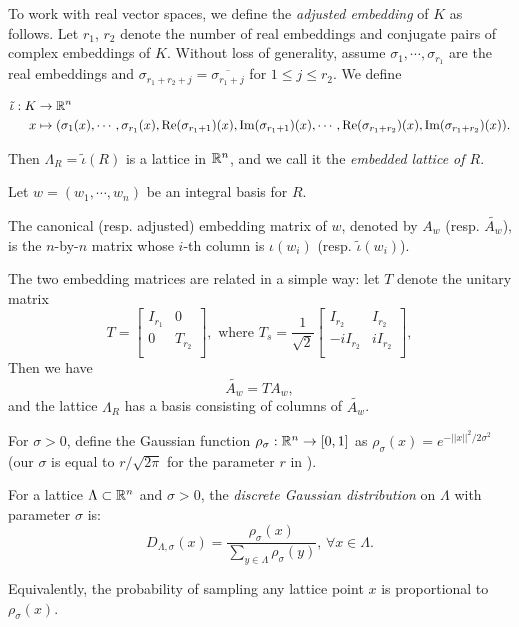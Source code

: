 \documentclass[envcountsame]{llncs}
\begin{document}
To work with real vector spaces, we define the {\it adjusted embedding} of $K$ as follows. Let $r_1$, $r_2$ denote the number of real embeddings and conjugate pairs of complex embeddings of $K$. Without loss of generality, assume $\sigma_1, \cdots, \sigma_{r_1}$ are the real embeddings and $\sigma_{r_1+r_2+j} = \overline{\sigma_{r_1 + j}}$ for $1 \leq j \leq r_2$. We define

\begin{align*}
    \tilde{\iota}: K & \to \mathbb{R}^n \\
    x & \mapsto (\sigma_1(x), \cdots, \sigma_{r_1}(x), \Re(\sigma_{r_1+1})(x), \Im(\sigma_{r_1+1})(x), \cdots,  \Re(\sigma_{r_1+r_2})(x), \Im(\sigma_{r_1+r_2})(x)).
\end{align*}

Then $\Lambda_R = \tilde{\iota}(R)$ is a lattice in $\mathbb{R}^n$, and we call it the {\it embedded lattice of $R$}.

Let $w = (w_1, \cdots , w_n)$ be an integral basis for $R$.

\begin{definition}
The canonical (resp. adjusted) embedding matrix of $w$, denoted by $A_w$ (resp. $\widetilde{A_w}$), is the $n$-by-$n$ matrix whose $i$-th column is $\iota(w_i)$ (resp. $\tilde{\iota}(w_i)$).
\end{definition}

The two embedding matrices are related in a simple way:
let $T$ denote the unitary matrix
\[
T = \begin{bmatrix}
    I_{r_1}  & 0  \\
    0     & T_{r_2} \\
\end{bmatrix},
\mbox{ where } T_s = \frac{1}{\sqrt{2}} \begin{bmatrix}
    I_{r_2}  & I_{r_2} \\
    -iI_{r_2}     & iI_{r_2} \\
\end{bmatrix},
\]
Then we have
$$\widetilde{A_{w}} = T A_{w},$$
and the lattice $\Lambda_R$ has a basis consisting of columns of $\widetilde{A_{w}}$.

For $\sigma > 0$, define the Gaussian function $\rho_\sigma: \mathbb{R}^n \to [0,1]$ as $\rho_\sigma(x) = e^{-||x||^2/2\sigma^2}$ (our $\sigma$ is equal to $r/\sqrt{2\pi}$ for the parameter $r$ in \cite{lyubashevsky2013ideal}).
\begin{definition}
For a lattice $\Lambda \subset \mathbb{R}^n$ and $\sigma > 0$, the {\it discrete Gaussian distribution} on $\Lambda$ with parameter $\sigma$ is:
\[
    D_{\Lambda, \sigma}(x) = \frac{\rho_\sigma(x)}{\sum_{y \in\Lambda} \rho_\sigma(y)}, \, \forall x \in \Lambda.
\]
\end{definition}
Equivalently, the probability of sampling any lattice point $x$ is proportional to $\rho_\sigma(x)$.
\end{document}
